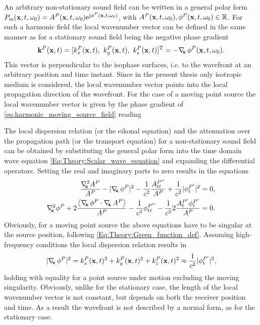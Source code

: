 An arbitrary non-stationary sound field can be written in a general polar form $P_{\mathrm{m}}(\mathbf{x},t,\omega_0) = A^P(\mathbf{x},t,\omega_0) \mathrm{e}^{\mathrm{j} \phi^P(\mathbf{x},t,\omega_0)}$, with $A^P(\mathbf{x},t,\omega_0),\phi^P(\mathbf{x},t,\omega_0) \in \mathbb{R}$.
For such a harmonic field the local wavenumber vector can be defined in the same manner as for a stationary sound field being the negative phase gradient
\begin{equation}
\label{eq:HF_appr:general_loc_wn}
\mathbf{k}^P(\mathbf{x},t) = [k_x^P(\mathbf{x},t),\ k_y^P(\mathbf{x},t),\ k_z^P(\mathbf{x},t)]^{\mathrm{T}} = -\nabla_{\!\!\mathbf{x}}\, \phi^P(\mathbf{x},t,\omega_0).
\end{equation}
This vector is perpendicular to the isophase surfaces, i.e. to the wavefront at an arbitrary position and time instant.
Since in the present thesis only isotropic medium is considered, the local wavenumber vector points into the local propagation direction of the wavefront.
For the case of a moving point source the local wavenumber vector is given by the phase gradient of \eqref{eq:harmonic_moving_source_field} reading

The local dispersion relation (or the eikonal equation) and the attenuation over the propagation path (or the transport equation) for a non-stationary sound field can be obtained by substituting the general polar form into the time domain wave equation \eqref{Eq:Theory:Scalar_wave_equation} and expanding the differential operators.
Setting the real and imaginary parts to zero results in the equations
\begin{eqnarray}
\frac{\Lx A^P}{A^P}  - | \Dx \phi^P |^2 -\frac{1}{c^2} \frac{A^{P''}_{tt}}{A^P} +\frac{1}{c^2}|\phi^{P'}_{t}|^2 = 0, \\ 
\label{eq:HF_appr:transport_eq_non_stat}
\Lx \phi^P + 2\frac{ \left< \Dx \phi^P \cdot \Dx A^P \right> }{A^P} - \frac{1}{c^2} \phi^{P''}_{tt} - \frac{1}{c^2} 2\frac{A^{P'}_t \phi^{P'}_t }{A^P} = 0.
\end{eqnarray}
Obviously, for a moving point source the above equations have to be singular at the source position, following \eqref{Eq:Theory:Green_function_def}.
Assuming high-frequency conditions the local dispersion relation results in
\begin{equation} \label{eq:HF_appr:eikonal_eq_non_stat}
| \nabla_{\!\!\mathbf{x}}\, \phi^P |^2 = k_x^P(\mathbf{x},t)^2 + k_y^P(\mathbf{x},t)^2 + k_z^P(\mathbf{x},t)^2 \approx \frac{1}{c^2}|\phi^{P'}_{t}|^2,
\end{equation}
holding with equality for a point source under motion excluding the moving singularity.
Obviously, unlike for the stationary case, the length of the local wavenumber vector is not constant, but depends on both the receiver position and time.
As a result the wavefront is not described by a normal form, as for the stationary case.

